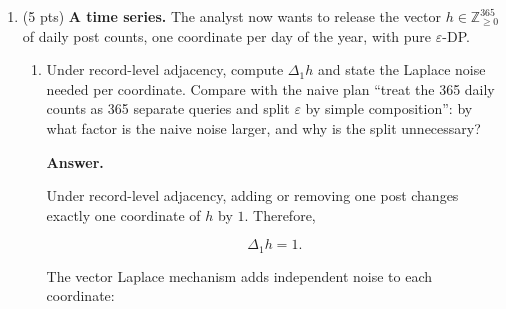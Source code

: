 \documentclass[11pt]{article}
\newcommand{\Z}{\mathbb{Z}}
\newcommand{\eps}{\varepsilon}
\newenvironment{answer}{\par\medskip\noindent\textbf{Answer.}\ }{\par\bigskip}
\begin{document}
\begin{enumerate}
\begin{enumerate}
\begin{answer}
\[
\begin{aligned}
\sigma_B
&=\frac{50}{5}
\sqrt{2\ln(1.25/10^{-8})}\\
&\approx61.064.
\end{aligned}
\]

Thus, $\sigma_A=\sigma_B$. For a user
with exactly $50$ posts, both mechanisms
have the same noise distribution and
the same change in the query when that
user is added or removed.

However, Route A's generic group-privacy
conversion gives
$\delta_{\mathrm{user}}\approx1.402\times10^{-5}$,
while Route B directly guarantees
$(5,10^{-8})$-DP.

This difference occurs because group privacy
is a general bound that does not exploit the
specific Gaussian noise distribution.
Directly analyzing the user-level sensitivity
can provide a much tighter guarantee.

Finally, since $N=10^6$, the rule of thumb is

\[
\delta\le\frac1N=10^{-6}.
\]

Route A's converted value is about $14$
times larger than this threshold, whereas
Route B's $\delta=10^{-8}$ satisfies it.

Thus, the lesson is that a generic group-privacy
conversion can be much looser than a direct
privacy analysis of the mechanism.

\end{answer}
\end{enumerate}

\item (5 pts) \textbf{A time series.} The analyst now wants to release the
vector $h\in\Z_{\ge0}^{365}$ of daily post counts, one coordinate per day of
the year, with pure $\eps$-DP.
\begin{enumerate}
\item Under record-level adjacency, compute $\Delta_1 h$ and state the
Laplace noise needed per coordinate. Compare with the naive plan ``treat the
365 daily counts as 365 separate queries and split $\eps$ by simple
composition'': by what factor is the naive noise larger, and why is the
split unnecessary?

\begin{answer}

Under record-level adjacency, adding or removing
one post changes exactly one coordinate of $h$
by $1$. Therefore,

\[
\boxed{\Delta_1 h=1}.
\]

The vector Laplace mechanism adds independent
noise to each coordinate:


\end{answer}
\end{enumerate}
\end{enumerate}
\end{document}
